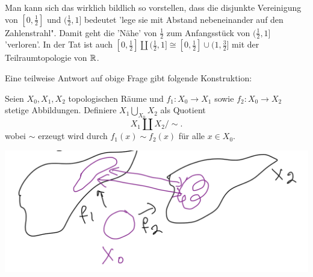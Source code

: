 \begin{remark*}
    Man kann sich das wirklich bildlich so vorstellen, dass die disjunkte Vereinigung von $[0,\frac{1}{2}]$ und $(\frac{1}{2},1]$ bedeutet 'lege sie mit Abstand nebeneinander auf den Zahlenstrahl". Damit geht die 'Nähe' von $\frac{1}{2}$ zum Anfangsstück von $(\frac{1}{2},1]$ 'verloren'. In der Tat ist auch $[0,\frac{1}{2}] \coprod (\frac{1}{2},1] \cong [0,\frac{1}{2}] \cup (1,\frac{3}{2}]$ mit der Teilraumtopologie von $\mathbb{R}$.
\end{remark*}
Eine teilweise Antwort auf obige Frage gibt folgende Konstruktion:
\begin{definition}\label{def:koprodukt-über-basisraum}
    Seien $X_0,X_1,X_2$ topologischen Räume und $f_1: X_0 \to  X_1$ sowie $f_2 : X_0 \to X_2$ stetige Abbildungen. Definiere $X_1 \bigcup\limits_{X_0} X_2$ als Quotient 
    \[
    X_1 \coprod X_2 / \sim 
    .\] 
    wobei $\sim $ erzeugt wird durch $f_1(x) \sim f_2(x)$ für alle $x\in X_0$.

    \begin{minipage}{\textwidth}
        \centering
        \includegraphics[scale=0.25]{figures/handdrawn/definition-disjunkte-vereinigung.png}
    \end{minipage}
\end{definition}


